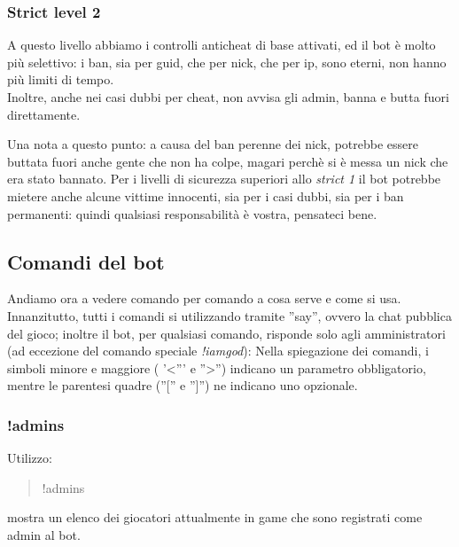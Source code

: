 \documentclass[a4paper]{article}
\begin{document}
\subsubsection{Strict level 2}
A questo livello abbiamo i controlli anticheat di base attivati, ed il bot \`e molto pi\`u selettivo: i ban, sia per guid, che per nick, che per ip, sono eterni, non hanno pi\`u limiti di tempo.\\
Inoltre, anche nei casi dubbi per cheat, non avvisa gli admin, banna e butta fuori direttamente.

Una nota a questo punto: a causa del ban perenne dei nick, potrebbe essere buttata fuori anche gente che non ha colpe, magari perch\`e si \`e messa un nick che era stato bannato. Per i livelli di sicurezza superiori allo \textit{strict 1} il bot potrebbe mietere anche alcune vittime innocenti, sia per i casi dubbi, sia per i ban permanenti: quindi qualsiasi responsabilit\`a \`e vostra, pensateci bene.

\newpage
\subsection{Comandi del bot}
Andiamo ora a vedere comando per comando a cosa serve e come si usa.
Innanzitutto, tutti i comandi si utilizzando tramite ''say'', ovvero la chat pubblica del gioco; inoltre il bot, per qualsiasi comando, risponde solo agli amministratori (ad eccezione del comando speciale \textit{!iamgod}):
Nella spiegazione dei comandi, i simboli minore e maggiore ( '\textless{}''' e ''\textgreater{}'') indicano un parametro obbligatorio, mentre le parentesi quadre (''['' e '']'') ne indicano uno opzionale.

\subsubsection{!admins}
Utilizzo:
\begin{quote}
!admins
\end{quote}
mostra un elenco dei giocatori attualmente in game che sono registrati come admin al bot.
\end{document}

